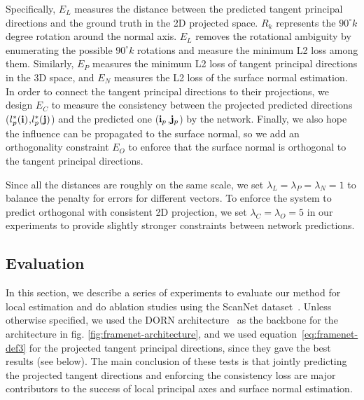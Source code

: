 Specifically, $E_L$ measures the distance between the predicted tangent principal directions and the ground truth in the 2D projected space. $R_k$ represents the $90^{\circ}k$ degree rotation around the normal axis. $E_L$ removes the rotational ambiguity by enumerating the possible $90^{\circ}k$ rotations and measure the minimum L2 loss among them. Similarly, $E_P$ measures the minimum L2 loss of tangent principal directions in the 3D space, and $E_N$ measures the L2 loss of the surface normal estimation. In order to connect the tangent principal directions to their projections, we design $E_C$ to measure the consistency between the projected predicted directions ($l^*_p(\mathbf{i})$,$l^*_p(\mathbf{j})$) and the predicted one ($\mathbf{i}_p$,$\mathbf{j}_p$) by the network. Finally, we also hope the influence can be propagated to the surface normal, so we add an orthogonality constraint $E_O$ to enforce that the surface normal is orthogonal to the tangent principal directions.

Since all the distances are roughly on the same scale, we set $\lambda_L=\lambda_P=\lambda_N=1$ to balance the penalty for errors for different vectors. To enforce the system to predict orthogonal \cframe{} with consistent 2D projection, we set $\lambda_C=\lambda_O=5$ in our experiments to provide slightly stronger constraints between network predictions.

\subsection{Evaluation}
\label{sec:framenet-evaluation}
In this section, we describe a series of experiments to evaluate our method for local \cframe{} estimation and do ablation studies using the ScanNet dataset~\cite{dai2017scannet}. 
Unless otherwise specified, we used the DORN architecture~\cite{fu2018deep} as the backbone for the architecture in fig. \ref{fig:framenet-architecture}, and we used equation~\ref{eq:framenet-def3} for the projected tangent principal directions, since they gave the best results (see below).
The main conclusion of these tests is that jointly predicting the projected tangent directions and enforcing the consistency loss are major contributors to the success of local principal axes and surface normal estimation.


